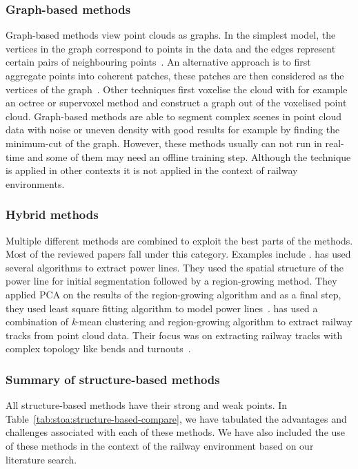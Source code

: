\subsubsection{Graph-based methods}
Graph-based methods view point clouds as graphs. In the simplest model, the vertices in the graph correspond to points in the data and the edges represent certain pairs of neighbouring points~\cite{dgcnn19}. An alternative approach is to first aggregate points into coherent patches, these patches are then considered as the vertices of the graph~\cite{Landrieu18}. Other techniques first voxelise the cloud with for example an octree or supervoxel method and construct a graph out of the voxelised point cloud. Graph-based methods are able to segment complex scenes in point cloud data with noise or uneven density with good results for example by finding the minimum-cut of the graph. However, these methods usually can not run in real-time and some of them may need an offline training step. Although the technique is applied in other contexts it is not applied in the context of railway environments. 

\subsubsection{Hybrid methods}
Multiple different methods are combined to exploit the best parts of the methods. Most of the reviewed papers fall under this category. Examples include
\cite{arastounia2016application,ariyachandra2020detection,ariyachandra2020digital,chbeir2015detection,Karunathilake20}.
\citeauthor{zhang2016automatic} has used several algorithms to extract power lines. They used the spatial structure of the power line for initial segmentation followed by a region-growing method. They applied PCA on the results of the region-growing algorithm and as a final step, they used least square fitting algorithm to model power lines~\cite{zhang2016automatic}. 
\citeauthor{zou2019efficient} has used a combination of \textit{k}-mean clustering and region-growing algorithm to extract railway tracks from point cloud data. Their focus was on extracting railway tracks with complex topology like bends and turnouts~\cite{zou2019efficient}.

\subsubsection{Summary of structure-based methods}
\par All structure-based methods have their strong and weak points. 
In Table~\ref{tab:stoa:structure-based-compare}, we have tabulated the advantages and challenges associated with each of these methods. We have also included the use of these methods in the context of the railway environment based on our literature search. 


